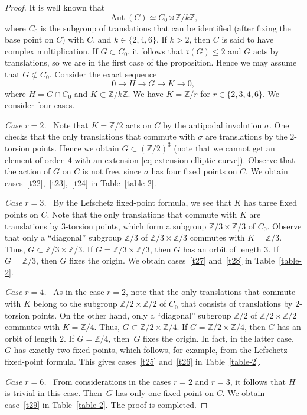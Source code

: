 \documentclass[11pt]{amsart}
\numberwithin{equation}{section}
\theoremstyle{definition}
\theoremstyle{remark}
\newcommand{\lra}{\longrightarrow}
\DeclareMathOperator{\Aut}{Aut}
\begin{document}
\begin{proof}
  It is well known  that 
\[
\Aut(C)\simeq C_0\rtimes \mathbb{Z}/k\mathbb{Z}, 
\]
where $C_0$ is the
subgroup of translations that can be identified (after fixing the base point on $C$) with $C$, and $k\in\{2,4,6\}$. 
If $k>2$, then $C$ is said to have complex multiplication. 
If $G\subset C_0$, it follows that $\mathfrak{r}(G)\leq 2$ and $G$ acts by translations, so we are in the first case of the proposition. Hence we may assume that $G\not\subset C_0$. 
Consider the exact sequence
\begin{equation}
\label{eq-extension-elliptic-curve}
0\lra H\lra G \lra K \lra 0, 
\end{equation}
where $H = G\cap C_0$ and $K\subset \mathbb{Z}/k\mathbb{Z}$. 
We have $K =\mathbb{Z}/r$ for $r\in\{2,3,4,6\}$. 
We consider four cases.

\emph{Case $r=2$.}~ 
Note that $K=\mathbb{Z}/2$ acts on $C$ by the antipodal involution $\sigma$. One checks that the only translations that commute with $\sigma$ are translations by the $2$-torsion points. Hence we obtain $G\subset
(\mathbb{Z}/2)^3$ (note that we cannot get an element of order~$4$ with an extension \eqref{eq-extension-elliptic-curve}). Observe that the action of $G$ on $C$ is not free, since $\sigma$ has four fixed points on $C$. We obtain cases~\eqref{t22},~\eqref{t23},~\eqref{t24} in Table~\ref{table-2}.

\emph{Case $r=3$.}~
By the Lefschetz fixed-point formula, we see that $K$ has three fixed points on $C$. Note that the only translations that commute with $K$ are translations by $3$-torsion points, which form a subgroup $\mathbb{Z}/3\times\mathbb{Z}/3$ of $C_0$.
Observe that only a ``diagonal'' subgroup $\mathbb{Z}/3$ of $\mathbb{Z}/3\times\mathbb{Z}/3$ commutes with $K =\mathbb{Z}/3$. Thus, $G\subset\mathbb{Z}/3\times\mathbb{Z}/3$. 
If $G=\mathbb{Z}/3\times\mathbb{Z}/3$, then $G$ has an orbit of length $3$. If $G=\mathbb{Z}/3$, then $G$ fixes the origin. 
We obtain cases~\eqref{t27} and~\eqref{t28} in Table~\ref{table-2}.

\emph{Case $r=4$.}~ 
As in the case $r=2$, note that the only translations that commute with $K$ belong to the subgroup $\mathbb{Z}/2\times\mathbb{Z}/2$ of $C_0$ that consists of translations by $2$-torsion points. On the other hand, only a ``diagonal'' subgroup $\mathbb{Z}/2$ of $\mathbb{Z}/2\times\mathbb{Z}/2$ commutes with $K=\mathbb{Z}/4$. Thus, $G\subset \mathbb{Z}/2\times\mathbb{Z}/4$.
If $G=\mathbb{Z}/2\times\mathbb{Z}/4$, then $G$ has an orbit of length $2$. If $G=\mathbb{Z}/4$, then~$G$ fixes the origin. 
In fact, in the latter case, $G$ has exactly two fixed points, which follows, for example, from the Lefschetz fixed-point formula. 
This gives cases~\eqref{t25} and~\eqref{t26} in Table~\ref{table-2}.
 
\emph{Case $r=6$.}~ 
From considerations in the cases $r=2$ and $r=3$, it follows that $H$ is trivial in this case.  
Then~$G$ has only one fixed point on $C$.
We obtain case~\eqref{t29} in Table~\ref{table-2}. The proof is completed.
\end{proof}
\end{document}
